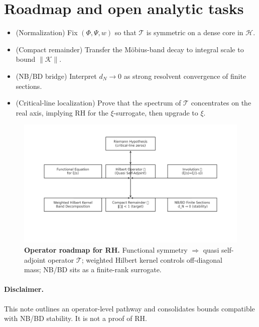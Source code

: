 \documentclass[11pt]{article}
\theoremstyle{remark}
\begin{document}
\section{Roadmap and open analytic tasks}
\begin{itemize}
\item (Normalization) Fix $(\Phi,\Psi,w)$ so that $\mathcal{T}$ is symmetric on a dense core in $\mathcal{H}$.
\item (Compact remainder) Transfer the M\"obius-band decay to integral scale to bound $\|\mathcal{K}\|$.
\item (NB/BD bridge) Interpret $d_N\to 0$ as strong resolvent convergence of finite sections.
\item (Critical-line localization) Prove that the spectrum of $\mathcal{T}$ concentrates on the real axis, implying RH for the $\xi$-surrogate, then upgrade to $\xi$.
\end{itemize}

\begin{figure}[t]
\centering
\includegraphics[width=.9\linewidth]{operator_framework_v3_3.png}
\caption{\textbf{Operator roadmap for RH.} Functional symmetry $\Rightarrow$ quasi self-adjoint operator $\mathcal{T}$; weighted Hilbert kernel controls off-diagonal mass; NB/BD sits as a finite-rank surrogate.}
\end{figure}

\paragraph{Disclaimer.}
This note outlines an operator-level pathway and consolidates bounds compatible with NB/BD stability. It is not a proof of RH.
\end{document}
